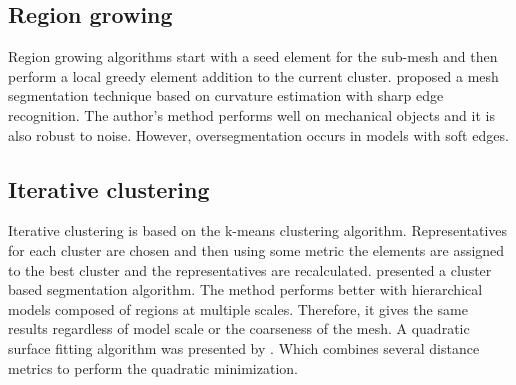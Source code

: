 \subsection{Region growing}

Region growing algorithms start with a seed element for the sub-mesh and then perform a local greedy element addition to the current cluster.
\cite{Mizoguchi2006} proposed a mesh segmentation technique based on curvature estimation with sharp edge recognition.
The author's method performs well on mechanical objects and it is also robust to noise.
However, oversegmentation occurs in models with soft edges.




\subsection{Iterative clustering}

Iterative clustering is based on the k-means clustering algorithm.
Representatives for each cluster are chosen and then using some metric  the elements are assigned to the best cluster and the representatives are recalculated.
\cite{Lai2006} presented a cluster based segmentation algorithm.
The method performs better with hierarchical models composed of regions at multiple scales.
Therefore, it gives the same results regardless of model scale or the coarseness of the mesh.
A quadratic surface fitting algorithm was presented by \cite{Yan2012}.
Which combines several distance metrics to perform the quadratic minimization.



